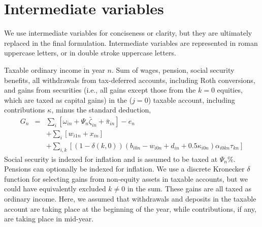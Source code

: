 \documentclass{report}[fleqn,11pt]
\begin{document}
\section{Intermediate variables}
We use intermediate variables for conciseness or clarity,
but they are ultimately replaced in the final formulation.
Intermediate variables are represented in roman uppercase letters, or in double stroke uppercase letters.
\begin{description}[leftmargin=4em,style=multiline]
\item [$G_n$]
	Taxable ordinary income in year $n$. Sum of wages, pension, social security benefits, all withdrawals
	from tax-deferred accounts, including Roth conversions, and gains from securities
	(i.e., all gains except those from the $k=0$ equities, which are taxed as capital gains)
	in the ($j=0$) taxable account, including contributions $\kappa$, minus the standard deduction,
	\begin{eqnarray}
		\label{Eq:Tx2}
		G_n &=& 
		\sum_i [\omega_{in} + \Psi_n\bar\zeta_{in} + \bar{\pi}_{in}]
		- e_n
		\nonumber \\
		&& + \sum_i [w_{i1n} + x_{in}]
		\nonumber \\
		&& + \sum_{i,k} 
		[(1-\delta(k, 0))(b_{i0n} - w_{i0n} + d_{in} + 0.5\kappa_{i0n})\alpha_{i0kn}\tau_{kn}]
	\end{eqnarray}
	Social security is indexed for inflation and is assumed to be taxed at $\Psi_n$\%.
	Pensions can optionally be indexed for inflation.
	We use a discrete Kronecker $\delta$ function for selecting gains from non-equity assets in
	taxable accounts, but we could have equivalently excluded $k \neq 0$ in the sum.
	These gains are all taxed as ordinary income. Here, we assumed that
	withdrawals and deposits in the taxable account are taking place at the beginning of the year, while
	contributions, if any, are taking place in mid-year.


\end{description}
\end{document}
